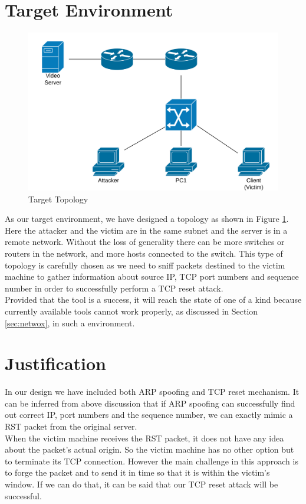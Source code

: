 \documentclass[14pt]{extarticle}
\begin{document}
    
\section{Target Environment}
    \label{sec:target_environment}
    \begin{figure}[!h]
        \centering
        \includegraphics[width=.95\textwidth]{Pictures/TCP_RST_Topology_Easy.png}
        \caption{Target Topology}
        \label{fig:topology}
    \end{figure}
    
     As our target environment, we have designed a topology as shown in Figure \ref{fig:topology}. Here the attacker and the victim are in the same subnet and the server is in a remote network. Without the loss of generality there can be more switches or routers in the network, and more hosts connected to the switch. This type of topology is carefully chosen as we need to sniff packets destined to the victim machine to gather information about source IP, TCP port numbers and sequence number in order to successfully perform a TCP reset attack. \\
     Provided that the tool is a success, it will reach the state of one of a kind because currently available tools cannot work properly, as discussed in Section \ref{sec:netwox}, in such a environment.


\section{Justification}
    In our design we have included both ARP spoofing and TCP reset mechanism. It can be inferred from above discussion that if ARP spoofing can successfully find out correct IP, port numbers and the sequence number, we can exactly mimic a RST packet from the original server. \\
    When the victim machine receives the RST packet, it does not have any idea about the packet's actual origin. So the victim machine has no other option but to terminate its TCP connection. However the main challenge in this approach is to forge the packet and to send it in time so that it is within the victim's window. If we can do that, it can be said that our TCP reset attack will be successful.
\end{document}
